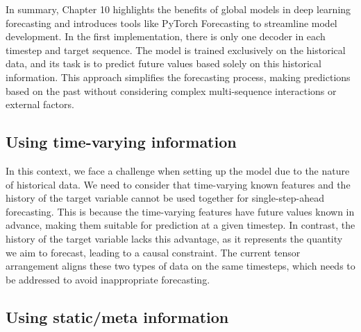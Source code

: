 \documentclass{article}
\begin{document}
In summary, Chapter 10 highlights the benefits of global models in deep learning forecasting and introduces tools like PyTorch Forecasting to streamline model development. 
In the first implementation, there is only one decoder in each timestep and target sequence. The model is trained exclusively on the historical data, and its task is to predict future values based solely on this historical information. This approach simplifies the forecasting process, making predictions based on the past without considering complex multi-sequence interactions or external factors.


\subsection{Using time-varying information}
In this context, we face a challenge when setting up the model due to the nature of historical data. We need to consider that time-varying known features and the history of the target variable cannot be used together for single-step-ahead forecasting. This is because the time-varying features have future values known in advance, making them suitable for prediction at a given timestep. In contrast, the history of the target variable lacks this advantage, as it represents the quantity we aim to forecast, leading to a causal constraint. The current tensor arrangement aligns these two types of data on the same timesteps, which needs to be addressed to avoid inappropriate forecasting.



\subsection{Using static/meta information}
\end{document}

